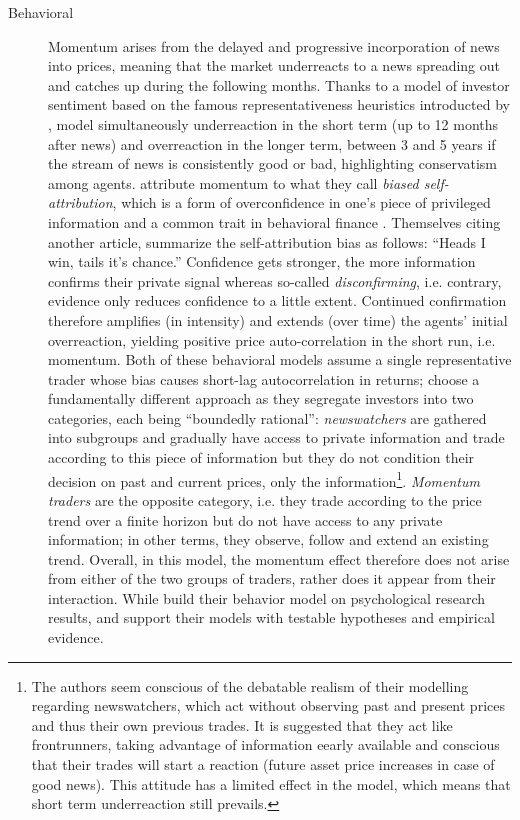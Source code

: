 \begin{description}
\item[Behavioral] Momentum arises from the delayed and progressive incorporation of news into prices, meaning that the market underreacts to a news spreading out and catches up during the following months. Thanks to a model of investor sentiment based on the famous representativeness heuristics introducted by \textcite{Tversky1974},\textcite{Barberis1998} model simultaneously underreaction in the short term (up to 12 months after news) and overreaction in the longer term, between 3 and 5 years if the stream of news is consistently good or bad, highlighting conservatism among agents. \textcite{Daniel1998} attribute momentum to what they call \emph{biased self-attribution}, which is a form of overconfidence in one's piece of privileged information and a common trait in behavioral finance \parencite{DeBondt1994}. Themselves citing another article, \textcite{Daniel1998} summarize the self-attribution bias as follows: ``Heads I win, tails it's chance.'' Confidence gets stronger, the more information confirms their private signal whereas so-called \emph{disconfirming}, i.e. contrary, evidence only reduces confidence to a little extent. Continued confirmation therefore amplifies (in intensity) and extends (over time) the agents' initial overreaction, yielding positive price auto-correlation in the short run, i.e. momentum. Both of these behavioral models assume a single representative trader whose bias causes short-lag autocorrelation in returns; \textcite{Hong1999} choose a fundamentally different approach as they segregate investors into two categories, each being ``boundedly rational'': \emph{newswatchers} are gathered into subgroups and gradually have access to private information and trade according to this piece of information but they do not condition their decision on past and current prices, only the information\footnote{The authors seem conscious of the debatable realism of their modelling regarding newswatchers, which act without observing past and present prices and thus their own previous trades. It is suggested that they act like frontrunners, taking advantage of information eearly available and conscious that their trades will start a reaction (future asset price increases in case of good news). This attitude has a limited effect in the model, which means that short term underreaction still prevails. }. \emph{Momentum traders} are the opposite category, i.e. they trade according to the price trend over a finite horizon but do not have access to any private information; in other terms, they observe, follow and extend an existing trend. Overall, in this model, the momentum effect therefore does not arise from either of the two groups of traders, rather does it appear from their interaction. While \textcite{Daniel1998} build their behavior model on psychological research results, \textcite{Barberis1998} and \textcite{Hong1999} support their models with testable hypotheses and empirical evidence.

\end{description}
